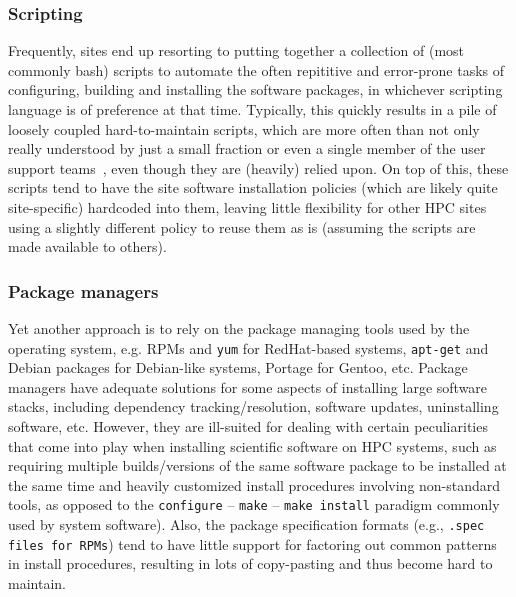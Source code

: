 \subsubsection{Scripting}

Frequently, sites end up resorting to putting together a collection of (most
commonly bash) scripts to automate the often repititive and error-prone tasks of
configuring, building and installing the software packages, in whichever scripting
language is of preference at that time. Typically, this quickly results in a pile of
loosely coupled hard-to-maintain scripts, which are more often than not only really
understood by just a small fraction or even a single member of the user support
teams~\cite{Jim}, even though they are (heavily) relied upon. On top of this, these
scripts tend to have the site software installation policies (which are likely quite
site-specific) hardcoded into them, leaving little flexibility for other HPC
sites using a slightly different policy to reuse them as is (assuming the scripts
are made available to others).

\subsubsection{Package managers}

Yet another approach is to rely on the package managing tools used
by the operating system, e.g. RPMs and \texttt{\small yum} for RedHat-based systems,
\texttt{\small apt-get} and Debian packages for Debian-like systems, Portage for
Gentoo, etc.
Package managers have adequate solutions for some aspects of
installing large software stacks, including dependency tracking/resolution, software
updates, uninstalling software, etc. However, they are ill-suited for dealing with
certain peculiarities that come into play when installing scientific software on
HPC systems, such as requiring multiple builds/versions of the same software package
to be installed at the same time and heavily customized install procedures involving
non-standard tools, as opposed to the \texttt{\small configure} --
\texttt{\small make} -- \texttt{\small make install} paradigm commonly used by
system software). Also, the package specification formats (e.g.,
\texttt{\small .spec files for RPMs}) tend to have little support for factoring out
common patterns in install procedures, resulting in lots of copy-pasting and thus
become hard to maintain.

